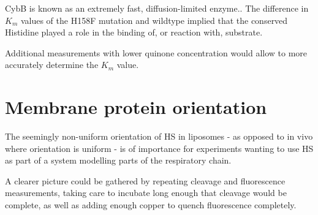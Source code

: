 CybB is known as an extremely fast, diffusion-limited
enzyme.\cite{superoxide_salvaging}. The difference in $K_m$ values of the H158F
mutation and wildtype implied that the conserved Histidine played a role in the
binding of, or reaction with, substrate.

Additional measurements with lower quinone concentration would allow to more
accurately determine the $K_m$ value.

\section{Membrane protein orientation}

The seemingly non-uniform orientation of HS in liposomes - as opposed to in
vivo where orientation is uniform - is of importance for experiments wanting to
use HS as part of a system modelling parts of the respiratory chain.

A clearer picture could be gathered by repeating cleavage and fluorescence
measurements, taking care to incubate long enough that cleavage would be
complete, as well as adding enough copper to quench fluorescence completely.


